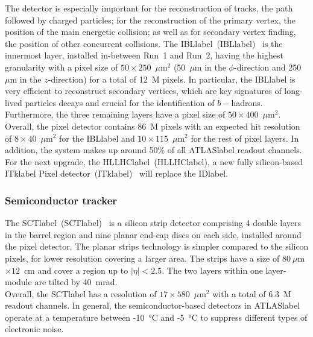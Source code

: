 The detector is especially important for the reconstruction of tracks, the path followed by charged particles; for the reconstruction of the primary vertex, the position of the main energetic collision; as well as for secondary vertex finding, the position of other concurrent collisions. The \acrlong{IBLlabel}~(\acrshort{IBLlabel})~\cite{Capeans:1291633} is the innermost layer, installed in-between Run~1 and Run~2, having the highest granularity with a pixel size of $50\times 250$~$\mu$m$^2$ (50~$\mu$m in the $\phi$-direction and 250~$\mu$m in the $z$-direction) for a total of 12~M pixels. In particular, the \acrshort{IBLlabel} is very efficient to reconstruct secondary vertices, which are key signatures of long-lived particles decays and crucial for the identification of $b-$hadrons. Furthermore, the three remaining layers have a pixel size of $50\times 400$~$\mu$m$^2$.\\

Overall, the pixel detector contains 86~M pixels with an expected hit resolution of $8\times 40$~$\mu$m$^2$ for the \acrshort{IBLlabel} and $10\times 115$~$\mu$m$^2$ for the rest of pixel layers. In addition, the system makes up around 50\% of all \acrshort{ATLASlabel} readout channels. For the next upgrade, the \acrlong{HLLHClabel}~(\acrshort{HLLHClabel}), a new fully silicon-based \acrlong{ITklabel} Pixel detector~(\acrshort{ITklabel})~\cite{CERN-LHCC-2017-021} will replace the \acrshort{IDlabel}.

\subsubsection*{Semiconductor tracker}

The \acrlong{SCTlabel}~(\acrshort{SCTlabel})~\cite{HABER1998161,SCTperformance} is a silicon strip detector comprising 4 double layers in the barrel region and nine planar end-cap discs on each side, installed around the pixel detector. The planar strips technology is simpler compared to the silicon pixels, for lower resolution covering a larger area. The strips have a size of $80~\mu$m$\times 12$~cm and cover a region up to $|\eta|<2.5$. The two layers within one layer-module are tilted by 40~mrad.\\

Overall, the \acrshort{SCTlabel} has a resolution of $17\times 580$~$\mu$m$^2$ with a total of 6.3~M readout channels. In general, the semiconductor-based detectors in \acrshort{ATLASlabel} operate at a temperature between -10~°C and -5~°C to suppress different types of electronic noise.


